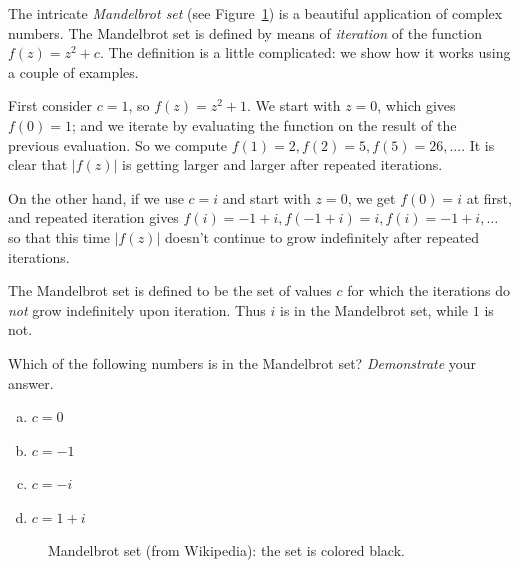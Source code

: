 \begin{exercise}\label{exercise:complex:mandelbrot}
The intricate \emph{Mandelbrot set} (see Figure~\ref{mandelbrot}) is a beautiful application of complex numbers.
The Mandelbrot set is defined by means of \emph{iteration} of the function $f(z) = z^2 + c$. The definition is a little complicated: we show how it works using a couple of examples.

First consider $c=1$, so $f(z) = z^2 + 1$. We start with $z=0$, which gives $f(0) = 1$; and we iterate by evaluating the function on the result of the previous evaluation. So we compute $f(1) = 2, f(2) = 5, f(5) = 26, ...$. It is clear that $|f(z)|$ is getting larger and larger after repeated iterations. 

On the other hand, if we use $c=i$ and start with $z=0$, we get $f(0) = i$ at first, and repeated iteration gives $f(i) = -1+i, f(-1+i) = i, f(i) = -1 + i, \ldots$ so that this time $|f(z)|$ doesn't continue to grow indefinitely after repeated iterations. 

The Mandelbrot set is defined to be the set of values $c$ for which the iterations do \emph{not} grow indefinitely upon iteration. Thus $i$ is in the Mandelbrot set, while $1$ is not. 

Which of the following numbers is in the Mandelbrot set? \emph{Demonstrate} your answer.
\begin{multicols}{2}
\begin{enumerate}[(a)]
\item
$c = 0$
\item
$c = -1$
\item
$c = -i$
\item
$c = 1+i$
\end{enumerate}
\end{multicols}
\end{exercise}

\begin{figure}[hbt]  
\caption{Mandelbrot set (from Wikipedia): the set is colored black.\label{mandelbrot}}
\end{figure}

